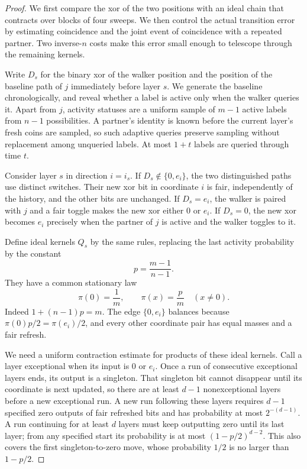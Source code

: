 \begin{proof}
We first compare the xor of the two positions with an ideal chain
that contracts over blocks of four sweeps. We then control the actual
transition error by estimating coincidence and the joint event of
coincidence with a repeated partner. Two inverse-$n$ costs make this
error small enough to telescope through the remaining kernels.

Write $D_s$ for the binary xor of the walker position and the position
of the baseline path of $j$ immediately before layer $s$.  We generate
the baseline chronologically, and reveal whether a label is active
only when the walker queries it.  Apart from $j$, activity statuses
are a uniform sample of $m-1$ active labels from $n-1$ possibilities.
A partner's identity is known before the current layer's fresh coins
are sampled, so such adaptive queries preserve sampling without
replacement among unqueried labels.  At most $1+t$ labels are queried
through time $t$.

Consider layer $s$ in direction $i=i_s$.  If
$D_s\notin\{0,e_i\}$, the two distinguished paths use distinct
switches.  Their new xor bit in coordinate $i$ is fair, independently
of the history, and the other bits are unchanged.  If $D_s=e_i$, the
walker is paired with $j$ and a fair toggle makes the new xor either
$0$ or $e_i$.  If $D_s=0$, the new xor becomes $e_i$ precisely when
the partner of $j$ is active and the walker toggles to it.

Define ideal kernels $Q_s$ by the same rules, replacing the last
activity probability by the constant
\[
 p=\frac{m-1}{n-1}.
\]
They have a common stationary law
\[
 \pi(0)=\frac1m,\qquad \pi(x)=\frac p m\quad(x\ne0).
\]
Indeed $1+(n-1)p=m$.  The edge $\{0,e_i\}$ balances because
$\pi(0)p/2=\pi(e_i)/2$, and every other coordinate pair has equal
masses and a fair refresh.

We need a uniform contraction estimate for products of these ideal
kernels.  Call a layer exceptional when its input is $0$ or $e_i$.
Once a run of consecutive exceptional layers ends, its output is a
singleton.  That singleton bit cannot disappear until its coordinate
is next updated, so there are at least $d-1$ nonexceptional layers
before a new exceptional run.  A new run following these layers
requires $d-1$ specified zero outputs of fair refreshed bits and has
probability at most $2^{-(d-1)}$.  A run continuing for at least $d$
layers must keep outputting zero until its last layer; from any
specified start its probability is at most
$(1-p/2)^{d-2}$.  This also covers the first singleton-to-zero move,
whose probability $1/2$ is no larger than $1-p/2$.


\end{proof}

